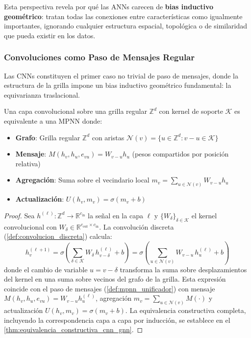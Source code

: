 Esta perspectiva revela por qué las \glspl{ANN} carecen de \textbf{bias inductivo geométrico}: tratan todas las conexiones entre características como igualmente importantes, ignorando cualquier estructura espacial, topológica o de similaridad que pueda existir en los datos.

\subsubsection{Convoluciones como Paso de Mensajes Regular}

Las \glspl{CNN} constituyen el primer caso no trivial de paso de mensajes, donde la estructura de la grilla impone un bias inductivo geométrico fundamental: la equivarianza traslacional.

\begin{proposition}\label{prop:cnn_mpnn}
Una capa convolucional sobre una grilla regular $\mathbb{Z}^d$ con kernel de soporte $\mathcal{K}$ es equivalente a una \gls{MPNN} donde:
\begin{itemize}
    \item \textbf{Grafo}: Grilla regular $\mathbb{Z}^d$ con aristas $\mathcal{N}(v) = \{u \in \mathbb{Z}^d : v - u \in \mathcal{K}\}$
    \item \textbf{Mensaje}: $M(h_v, h_u, e_{vu}) = W_{v-u} h_u$ (pesos compartidos por posición relativa)
    \item \textbf{Agregación}: Suma sobre el vecindario local $m_v = \sum_{u \in \mathcal{N}(v)} W_{v-u} h_u$
    \item \textbf{Actualización}: $U(h_v, m_v) = \sigma(m_v + b)$
\end{itemize}
\end{proposition}

\begin{proof}
Sea $h^{(\ell)}: \mathbb{Z}^d \to \mathbb{R}^{c_{\mathrm{in}}}$ la señal en la capa $\ell$ y $\{W_\delta\}_{\delta \in \mathcal{K}}$ el kernel convolucional con $W_\delta \in \mathbb{R}^{c_{\mathrm{out}} \times c_{\mathrm{in}}}$. La convolución discreta (\autoref{def:convolucion_discreta}) calcula:
\[
h_v^{(\ell+1)} = \sigma\!\left(\sum_{\delta \in \mathcal{K}} W_\delta\, h_{v-\delta}^{(\ell)} + b\right) = \sigma\!\left(\sum_{u \in \mathcal{N}(v)} W_{v-u}\, h_u^{(\ell)} + b\right)
\]
donde el cambio de variable $u = v - \delta$ transforma la suma sobre desplazamientos del kernel en una suma sobre vecinos del grafo de la grilla. Esta expresión coincide con el paso de mensajes (\autoref{def:mpnn_unificador}) con mensaje $M(h_v, h_u, e_{vu}) = W_{v-u} h_u^{(\ell)}$, agregación $m_v = \sum_{u \in \mathcal{N}(v)} M(\cdot)$ y actualización $U(h_v, m_v) = \sigma(m_v + b)$. La equivalencia constructiva completa, incluyendo la correspondencia capa a capa por inducción, se establece en el \autoref{thm:equivalencia_constructiva_cnn_gnn}.
\end{proof}

